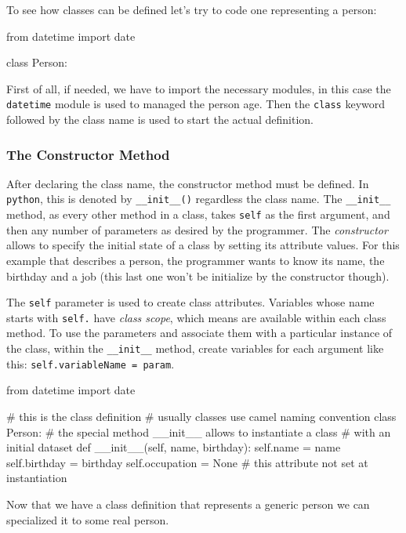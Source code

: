 To see how classes can be defined let's try to code one representing a person:
\begin{ipython}
from datetime import date        

class Person:
\end{ipython}

First of all, if needed, we have to import the necessary modules, in this case the 
\texttt{datetime} module is used to managed the person age.
Then the \texttt{class} keyword followed by the class name is used to start the actual definition.

\subsubsection{The Constructor Method}\label{the-constructor-method}

After declaring the class name, the constructor method must be defined. In \texttt{python}, this is denoted by \texttt{\_\_init\_\_()} regardless the class name. The \texttt{\_\_init\_\_} method, as every other method in a class, takes \texttt{self} as the first argument, and then any number of parameters as desired by the programmer. The \emph{constructor} allows to specify the initial state of a class by setting its attribute values. For this example that describes a person, the programmer wants to know its name, the birthday and a job (this last one won't be initialize by the constructor though).

The \texttt{self} parameter is used to create class attributes. Variables
whose name starts with \texttt{self.} have \emph{class scope}, which means are
available within each class method. To use the parameters and
associate them with a particular instance of the class, within the
\texttt{\_\_init\_\_} method, create variables for each argument like
this: \texttt{self.variableName\ =\ param}.

\begin{ipython}
from datetime import date

# this is the class definition
# usually classes use camel naming convention
class Person:
    # the special method __init__ allows to instantiate a class
    # with an initial dataset
    def __init__(self, name, birthday):
        self.name = name
        self.birthday = birthday
        self.occupation = None # this attribute not set at instantiation
\end{ipython}

Now that we have a class definition that represents a generic person we can specialized it to some real person.

